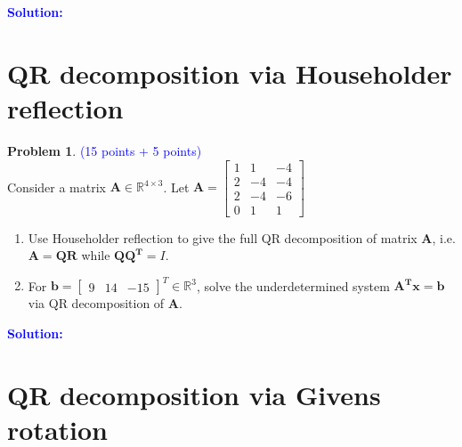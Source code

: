 \documentclass[english,onecolumn]{IEEEtran}
\begin{document}
\noindent\textcolor{blue}{
	\textbf{Solution:}
}

\newpage
\section{QR decomposition via Householder reflection}
\noindent\textbf{Problem 1}. \textcolor{blue}{(15 points + 5 points)}\\
Consider a matrix $\mathbf{A} \in \mathbb{R}^{4 \times 3}$. Let  $\mathbf{A} = \begin{bmatrix}
 1 & 1 & -4\\ 
 2 & -4 & -4\\ 
 2 & -4 & -6\\ 
 0 & 1 & 1
\end{bmatrix}$ \\
\begin{enumerate}
  \item Use Householder reflection to give the full QR decomposition of matrix $ \mathbf{A}$, i.e. $ \mathbf{A}= \mathbf{QR}$ while $\mathbf{QQ^T}=I$.
  \item For $\mathbf{b} = \begin{bmatrix}
 9 & 14 & -15 \end{bmatrix}^T \in \mathbb{R}^{3} $, solve the underdetermined system $\mathbf{A^Tx} = \mathbf{b}$ via QR decomposition of $\mathbf{A}$. 
\end{enumerate}

\noindent\textcolor{blue}{
	\textbf{Solution:}
}


\newpage
\section{QR decomposition via Givens rotation}
\end{document}
